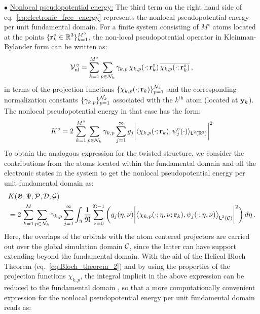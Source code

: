 \documentclass[preprint,12pt, 3p, sort&compress]{elsarticle}
\begin{document}
$\bullet$ \underline{Nonlocal pseudopotential energy:} The third term on the right hand side of eq.~\ref{eq:electronic_free_energy} represents the nonlocal pseudopotential energy per unit fundamental domain. For a finite system consisting of $M^{\circ}$ atoms located at the points $\displaystyle \{{\bf r}_k^{{\circ}} \in \mathbb{R}^3\}_{k=1}^{M^{\circ}}$, the non-local pseudopotential operator in Kleinman-Bylander form \citep{kleinman1982efficacious} can be written as:
\begin{align}
{\cal V}_{\text{nl}}^{\,\circ} = \sum_{k=1}^{M^{\circ}}\sum_{p \in {\cal N}_k}\gamma_{k,p}\,\chi_{k,p}(\cdot;{\bf r}_k^{\circ})\,\overline{\chi_{k,p}(\cdot;{\bf r}_k^{\circ})}\,,
\label{eq:Kleinman_Bylander_form}
\end{align}
in terms of the projection functions $\displaystyle \{\chi_{k,p}(\cdot;{\bf r}_k)\}_{p=1}^{{\cal N}_k}$ and the corresponding normalization constants $\displaystyle\{\gamma_{k,p}\}_{p=1}^{{\cal N}_k}$ associated with the $k^{\text{th}}$ atom (located at ${\bf y}_k$). The nonlocal pseudopotential energy in that case has the form:
\begin{align}
K^{\circ} = 2\, \sum_{k=1}^{M^{\circ}}\sum_{p \in {\cal N}_k}\gamma_{k,p}\sum_{j=1}^{\infty}g_j \bigg\lvert \langle\chi_{k,p}(\cdot;{\bf r}_k),\psi_j^{\circ}(\cdot)\rangle_{\textsf{L}^{2}_{}({\mathbb{R}^3})} \bigg\rvert^2
\label{eq:Finite_Vnl_Expression}
\end{align}
To obtain the analogous expression for the twisted structure, we consider the contributions from the atoms located within the fundamental domain and all the electronic states in the system \citep{banerjee2021ab} to get the nonlocal pseudopotential energy per unit fundamental domain as:
\begin{align}
\nonumber
&K(\mathfrak{G}, \Psi, {\cal P}, {\cal D}, {\cal G})\\
&= 2\,\sum_{k=1}^{M}\sum_{p \in {\cal N}_k}\gamma_{k,p}\sum_{j=1}^{\infty}\int_{\mathfrak{I}}\frac{1}{\mathfrak{N}}\sum_{\nu = 0}^{\mathfrak{N}-1}\bigg(g_j(\eta, \nu)\bigg\lvert{\big\langle{{\chi}_{k,p}(\cdot;\eta, \nu;{\bf r}_k)},{\psi_j(\cdot; \eta, \nu)}\big\rangle}_{\textsf{L}^{2}_{}({{\cal C}})}\bigg\rvert^2\bigg)\,d\eta\,.
\end{align}
Here, the overlaps of the  orbitals with the atom centered projectors are carried out over the global simulation domain ${\cal C}$, since the latter can have support extending beyond the fundamental domain. With the aid of the Helical  Bloch Theorem (eq.~\ref{eq:Bloch_theorem_2}) and by using the properties of the projection functions ${\chi}_{k,p}$, the integral implicit in the above expression can be reduced to the fundamental domain \citep{ghosh2019symmetry, banerjee2021ab}, so that a more computationally convenient expression for the nonlocal pseudopotential energy per unit fundamental domain reads as:
\end{document}
